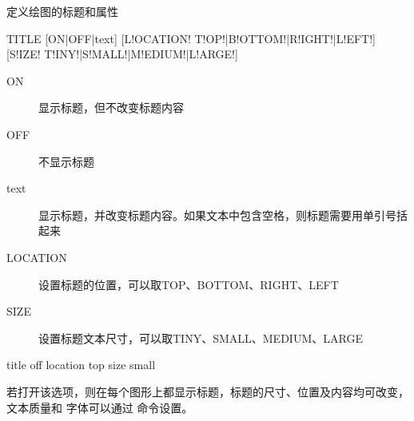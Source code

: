 \label{cmd:title}

定义绘图的标题和属性

\begin{SACSTX}
TITLE [ON|OFF|text] [L!OCATION! T!OP!|B!OTTOM!|R!IGHT!|L!EFT!]
    [S!IZE! T!INY!|S!MALL!|M!EDIUM!|L!ARGE!]
\end{SACSTX}

\begin{description}
\item [ON] 显示标题，但不改变标题内容
\item [OFF] 不显示标题
\item [text] 显示标题，并改变标题内容。如果文本中包含空格，则标题需要用单引号括起来
\item [LOCATION] 设置标题的位置，可以取TOP、BOTTOM、RIGHT、LEFT
\item [SIZE] 设置标题文本尺寸，可以取TINY、SMALL、MEDIUM、LARGE
\end{description}

\begin{SACDFT}
title off location top size small
\end{SACDFT}

若打开该选项，则在每个图形上都显示标题，标题的尺寸、位置及内容均可改变，文本质量和
字体可以通过  命令设置。

